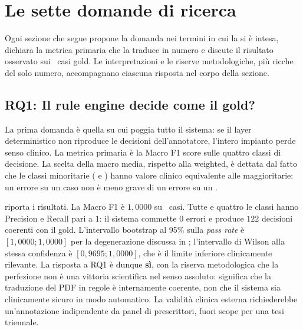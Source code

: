 \chapter{Le sette domande di ricerca}
\label{ch:valutazione}

Ogni sezione che segue propone la domanda nei termini in cui la si è intesa, dichiara la metrica primaria che la traduce in numero e discute il risultato osservato sui \goldn\ casi gold. Le interpretazioni e le riserve metodologiche, più ricche del solo numero, accompagnano ciascuna risposta nel corpo della sezione.

\section{RQ1: Il rule engine decide come il gold?}
\label{sec:rq1}

La prima domanda è quella su cui poggia tutto il sistema: se il layer deterministico non riproduce le decisioni dell'annotatore, l'intero impianto perde senso clinico. La metrica primaria è la Macro F1 score sulle quattro classi di decisione. La scelta della macro media, rispetto alla weighted, è dettata dal fatto che le classi minoritarie ( e ) hanno valore clinico equivalente alle maggioritarie: un errore su un caso  non è meno grave di un errore su un .

 riporta i risultati. La Macro F1 è $1{,}0000$ su \goldn\ casi. Tutte e quattro le classi hanno Precision e Recall pari a $1$: il sistema commette $0$ errori e produce $122$ decisioni coerenti con il gold. L'intervallo bootstrap al 95\% sulla \emph{pass rate} è $[1{,}0000;1{,}0000]$ per la degenerazione discussa in ; l'intervallo di Wilson alla stessa confidenza è $[0{,}9695;1{,}0000]$, che è il limite inferiore clinicamente rilevante. La risposta a RQ1 è dunque \textbf{sì}, con la riserva metodologica che la perfezione non è una vittoria scientifica nel senso assoluto: significa che la traduzione del PDF in regole è internamente coerente, non che il sistema sia clinicamente sicuro in modo automatico. La validità clinica esterna richiederebbe un'annotazione indipendente da panel di prescrittori, fuori scope per una tesi triennale.

